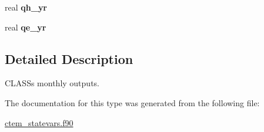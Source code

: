 \begin{DoxyCompactItemize}
\item 
\hypertarget{structctem__statevars_1_1class__moyr__output_af7c7ec3fb4d079015dc33d8e493e26f9}{}real {\bfseries qh\+\_\+yr}\label{structctem__statevars_1_1class__moyr__output_af7c7ec3fb4d079015dc33d8e493e26f9}

\item 
\hypertarget{structctem__statevars_1_1class__moyr__output_ac08485e4a8189fd2a36527285320372f}{}real {\bfseries qe\+\_\+yr}\label{structctem__statevars_1_1class__moyr__output_ac08485e4a8189fd2a36527285320372f}

\end{DoxyCompactItemize}


\subsection{Detailed Description}
C\+L\+A\+S\+S\textquotesingle{}s monthly outputs. 

The documentation for this type was generated from the following file\+:\begin{DoxyCompactItemize}
\item 
\hyperlink{ctem__statevars_8f90}{ctem\+\_\+statevars.\+f90}\end{DoxyCompactItemize}
